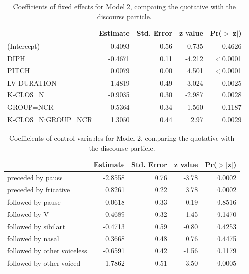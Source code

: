   

\begin{table}[ht]
\begin{center}
\begin{tabular}{lrrrr}
  \hline
 & Estimate & Std. Error & z value& Pr($>$$|$z$|$) \\
  \hline

(Intercept)   &  -0.4093 &  0.56  & -0.735 & 0.4626 \\
  DIPH        &  -0.4671 &  0.11  & -4.212 &  $<$0.0001 \\
  PITCH       &  0.0079  & 0.00   & 4.501  & $<$0.0001 \\
  LV DURATION &  -1.4819 &  0.49  & -3.024 & 0.0025 \\
  K-CLOS=N    &  -0.9035 &  0.30 & -2.987 & 0.0028 \\
  GROUP=NCR   &  -0.5364 &  0.34  & -1.560 & 0.1187 \\
  K-CLOS=N:GROUP=NCR  &  1.3050  & 0.44  & 2.97 & 0.0029 \\

   \hline
\end{tabular}
\caption{Coefficients of fixed effects for Model 2, comparing the quotative with the discourse particle.}
\label{qdpcoeffProd}
\end{center}
\end{table}
  


 
\begin{table}[ht]
\begin{center}
\begin{tabular}{lrrrr}
  \hline
 & Estimate & Std. Error & z value& Pr($>$$|$z$|$) \\
  \hline
  preceded by pause     &  -2.8558 &  0.76 & -3.78 & 0.0002 \\
  preceded by fricative  &  0.8261  & 0.22 &   3.78 & 0.0002 \\
  followed by pause     &  0.0618  & 0.33  & 0.19 & 0.8516 \\
  followed by V         &  0.4689  & 0.32  & 1.45 &  0.1470  \\
  followed by sibilant  & -0.4713 & 0.59  & -0.80 &  0.4253 \\
	followed by nasal   & 0.3668   & 0.48  & 0.76 &  0.4475 \\
	followed by other voiceless  & -0.6591 &  0.42 & -1.56 & 0.1179 \\
	followed by other voiced   & -1.7862  & 0.51 & -3.50 & 0.0005 \\   
	
	\hline
\end{tabular}
\caption{Coefficients of control variables for Model 2, comparing the quotative with the discourse particle.}
\label{qdpcoeffProd-control}
\end{center}
\end{table}


